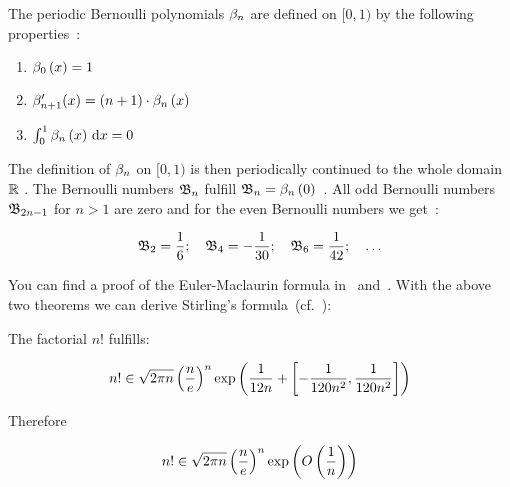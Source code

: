 The periodic Bernoulli polynomials $\bps$ are defined on $[0,1)$ by the following properties~\cite[p. 291]{koenigsberger}:

\begin{enumerate}
  \item $\bp[0]{x} = 1$
  \item $\bps[n+1]'(x) = (n+1)\cdot \bp{x}$
  \item $\int_0^1 \bp{x} \d{x} = 0$
\end{enumerate}

The definition of $\bps$ on $[0,1)$ is then periodically continued to the whole domain $\R$ . The Bernoulli numbers $\bn$ fulfill $\bn=\bp{0}$~\cite[p.~290]{koenigsberger}. All odd Bernoulli numbers $\bn[2n-1]$ for $n>1$ are zero and for the even Bernoulli numbers we get~\cite[p.~289]{koenigsberger}:

\begin{align}
  \bn[2] = \frac 16;\quad \bn[4]=-\frac{1}{30};\quad \bn[6]=\frac{1}{42};\quad \ldots
\end{align}

You can find a proof of the Euler-Maclaurin formula in~\cite[pp.~225-226]{koenigsberger} and~\cite[pp.~506-509]{heuser}. With the above two theorems we can derive Stirling's formula~(cf.~\cite[p.~228]{koenigsberger}):

\begin{theorem}
  The factorial $n!$ fulfills:

  \begin{align}
    n! \in \sqrt{2\pi n} \left(\frac ne\right)^n \fexp{\frac 1{12n} + \interval{-\frac{1}{120n^2} }{\frac{1}{120n^2}} }
  \end{align}

  \noindent Therefore

  \begin{align}
     n! \in \sqrt{2\pi n} \left(\frac ne\right)^n \fexp{\bigo{\frac 1n}}
  \end{align}
\end{theorem}

